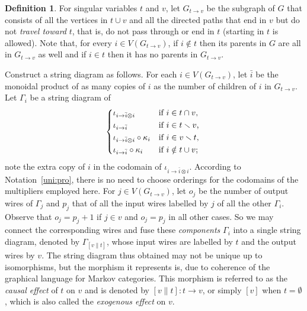 \documentclass[12pt]{amsart}
\theoremstyle{plain}
\theoremstyle{definition}
\newtheorem{defn}[thm]{Definition}
\theoremstyle{remark}
\numberwithin{equation}{section}
\theoremstyle{plain}
\newcommand{\0}{\emptyset}
\newcommand{\fun}{\longrightarrow}
\newcommand{\mi}{\smallsetminus}
\newcommand{\memph}[1]{{\color{magenta}\emph{#1}}}
\newcommand{\stri}{\Gamma}
\begin{document}
\begin{defn}\label{gen:condi}
For singular variables $t$ and $v$, let $G_{t \rightarrow v}$ be the subgraph of $G$ that consists of all the vertices in $t \cup v$ and all the directed paths that end in $v$ but do not \memph{travel toward} $t$, that is, do not pass through or end in $t$ (starting in $t$ is allowed). Note that, for every  $i \in V(G_{t \rightarrow v})$, if $i \notin t$ then its parents in $G$ are all in $G_{t \rightarrow v}$ as well and if $i \in t$ then it has no parents in $G_{t \rightarrow v}$.

Construct a string diagram  as follows. For each $i \in V(G_{t \rightarrow v})$, let $\bar i$ be the monoidal product of as many copies of $i$ as the number of children of $i$ in $G_{t \rightarrow v}$. Let $\stri_i$ be a  string diagram of
\[
\begin{dcases*}
   \iota_{i \rightarrow \bar i \otimes i}                & if $i \in t \cap v$,\\
   \iota_{i \rightarrow \bar i}                            & if $i \in t \mi v$,\\
  \iota_{i \rightarrow \bar i \otimes i} \circ \kappa_i  & if $i \in v \mi t$,\\
  \iota_{i \rightarrow \bar i} \circ \kappa_i              & if $i \notin t \cup v$;
\end{dcases*}
\]
note  the extra copy of $i$ in the codomain of $\iota_{i \rightarrow \bar i \otimes i}$. According to Notation~\ref{uni:pro}, there is no need to choose orderings for the codomains of the multipliers employed here. For $j \in V(G_{t \rightarrow v})$, let $o_j$ be the number of output wires of $\stri_j$ and $p_j$ that of all the input wires labelled by $j$ of all the other  $\stri_i$. Observe that  $o_j = p_j + 1$ if $j \in v$ and  $o_j = p_j$ in all other cases. So we may connect the corresponding wires and fuse these \memph{components} $\stri_i$ into a single  string diagram, denoted by $\stri_{[v \| t]}$, whose input wires are labelled by $t$ and the output wires by $v$.  The string diagram thus obtained may not be unique up to isomorphisms, but the morphism it represents is, due to  coherence of  the graphical language for Markov categories. This morphism is referred to as the \memph{causal effect} of $t$ on $v$ and is denoted by $[v \| t] : t \fun v$, or simply $[v]$ when $t = \0$, which is also called the \memph{exogenous effect} on $v$.
\end{defn}
\end{document}
